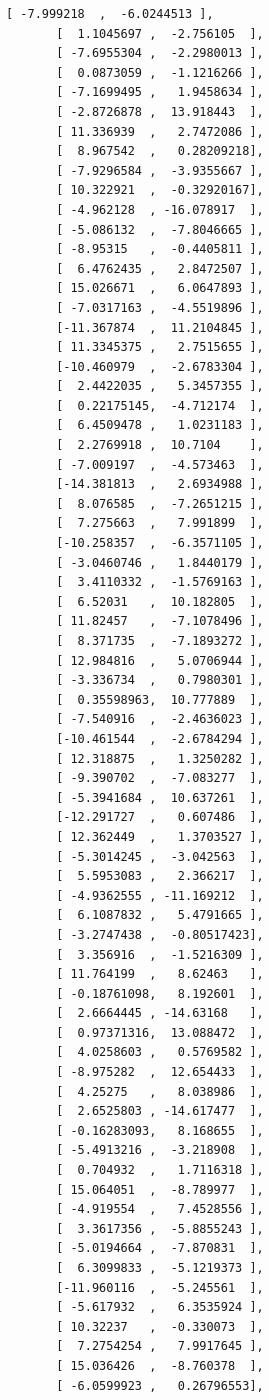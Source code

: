 \documentclass[11pt]{article}
\begin{document}
\begin{tcolorbox}[breakable, size=fbox, boxrule=.5pt, pad at break*=1mm, opacityfill=0]
\begin{Verbatim}[commandchars=\\\{\}]
       [ -7.999218  ,  -6.0244513 ],
       [  1.1045697 ,  -2.756105  ],
       [ -7.6955304 ,  -2.2980013 ],
       [  0.0873059 ,  -1.1216266 ],
       [ -7.1699495 ,   1.9458634 ],
       [ -2.8726878 ,  13.918443  ],
       [ 11.336939  ,   2.7472086 ],
       [  8.967542  ,   0.28209218],
       [ -7.9296584 ,  -3.9355667 ],
       [ 10.322921  ,  -0.32920167],
       [ -4.962128  , -16.078917  ],
       [ -5.086132  ,  -7.8046665 ],
       [ -8.95315   ,  -0.4405811 ],
       [  6.4762435 ,   2.8472507 ],
       [ 15.026671  ,   6.0647893 ],
       [ -7.0317163 ,  -4.5519896 ],
       [-11.367874  ,  11.2104845 ],
       [ 11.3345375 ,   2.7515655 ],
       [-10.460979  ,  -2.6783304 ],
       [  2.4422035 ,   5.3457355 ],
       [  0.22175145,  -4.712174  ],
       [  6.4509478 ,   1.0231183 ],
       [  2.2769918 ,  10.7104    ],
       [ -7.009197  ,  -4.573463  ],
       [-14.381813  ,   2.6934988 ],
       [  8.076585  ,  -7.2651215 ],
       [  7.275663  ,   7.991899  ],
       [-10.258357  ,  -6.3571105 ],
       [ -3.0460746 ,   1.8440179 ],
       [  3.4110332 ,  -1.5769163 ],
       [  6.52031   ,  10.182805  ],
       [ 11.82457   ,  -7.1078496 ],
       [  8.371735  ,  -7.1893272 ],
       [ 12.984816  ,   5.0706944 ],
       [ -3.336734  ,   0.7980301 ],
       [  0.35598963,  10.777889  ],
       [ -7.540916  ,  -2.4636023 ],
       [-10.461544  ,  -2.6784294 ],
       [ 12.318875  ,   1.3250282 ],
       [ -9.390702  ,  -7.083277  ],
       [ -5.3941684 ,  10.637261  ],
       [-12.291727  ,   0.607486  ],
       [ 12.362449  ,   1.3703527 ],
       [ -5.3014245 ,  -3.042563  ],
       [  5.5953083 ,   2.366217  ],
       [ -4.9362555 , -11.169212  ],
       [  6.1087832 ,   5.4791665 ],
       [ -3.2747438 ,  -0.80517423],
       [  3.356916  ,  -1.5216309 ],
       [ 11.764199  ,   8.62463   ],
       [ -0.18761098,   8.192601  ],
       [  2.6664445 , -14.63168   ],
       [  0.97371316,  13.088472  ],
       [  4.0258603 ,   0.5769582 ],
       [ -8.975282  ,  12.654433  ],
       [  4.25275   ,   8.038986  ],
       [  2.6525803 , -14.617477  ],
       [ -0.16283093,   8.168655  ],
       [ -5.4913216 ,  -3.218908  ],
       [  0.704932  ,   1.7116318 ],
       [ 15.064051  ,  -8.789977  ],
       [ -4.919554  ,   7.4528556 ],
       [  3.3617356 ,  -5.8855243 ],
       [ -5.0194664 ,  -7.870831  ],
       [  6.3099833 ,  -5.1219373 ],
       [-11.960116  ,  -5.245561  ],
       [ -5.617932  ,   6.3535924 ],
       [ 10.32237   ,  -0.330073  ],
       [  7.2754254 ,   7.9917645 ],
       [ 15.036426  ,  -8.760378  ],
       [ -6.0599923 ,   0.26796553],

\end{Verbatim}
\end{tcolorbox}
\end{document}
